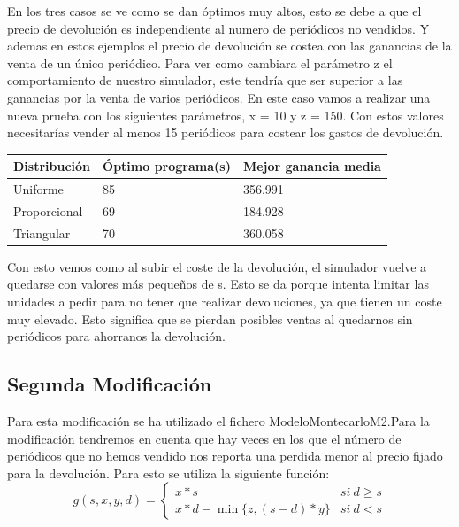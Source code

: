 \documentclass[]{article}
\begin{document}
En los tres casos se ve como se dan óptimos muy altos, esto se debe a que el precio de devolución es independiente al numero de periódicos no vendidos. Y ademas en estos ejemplos el precio de devolución se costea con las ganancias de la venta de un único periódico. Para ver como cambiara el parámetro z el comportamiento de nuestro simulador, este tendría que ser superior a las ganancias por la venta de varios periódicos. En este caso vamos a realizar una nueva prueba con los siguientes parámetros, x = 10 y z = 150. Con estos valores necesitarías vender al menos 15 periódicos para costear los gastos de devolución.

\begin{table}[H]
	\begin{center}
		\begin{tabular}{|l|l|l|}
			
			\hline
			Distribución & Óptimo programa(s) & Mejor ganancia media\\
			\hline \hline
			Uniforme &  85 & 356.991
			\\ \hline
			Proporcional & 69 & 184.928 
			\\ \hline
			Triangular & 70 & 360.058
			\\ \hline
			
		\end{tabular}
		
		\label{tabla:sencilla}
	\end{center}
\end{table}

Con esto vemos como al subir el coste de la devolución, el simulador vuelve a quedarse con valores más pequeños de s. Esto se da porque intenta limitar las unidades a pedir para no tener que realizar devoluciones, ya que tienen un coste muy elevado. Esto significa que se pierdan posibles ventas al quedarnos sin periódicos para ahorranos la devolución.

\subsection{Segunda Modificación}
Para esta modificación se ha utilizado el fichero ModeloMontecarloM2.Para la modificación tendremos en cuenta que hay veces en los que el número de periódicos que no hemos vendido nos reporta una perdida menor al precio fijado para la devolución. Para esto se utiliza la siguiente función:
$$
g(s, x, y, d)=\left\{\begin{array}{ll}{x * s} & { { si \ } d \geq s} \\ {x * d-\min \{z,(s-d) * y\}} & { { si \ } d<s}\end{array}\right.
$$
\end{document}
